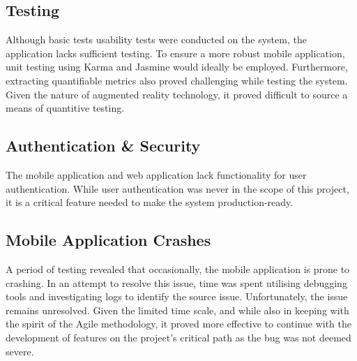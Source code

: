 \subsection{Testing}
Although basic tests usability tests were conducted on the system, the application lacks sufficient testing. To ensure a more robust mobile application, unit testing using Karma and Jasmine would ideally be employed. Furthermore, extracting quantifiable metrics also proved challenging while testing the system. Given the nature of augmented reality technology, it proved difficult to source a means of quantitive testing. 

\subsection{Authentication \& Security}
The mobile application and web application lack functionality for user authentication. While user authentication was never in the scope of this project, it is a critical feature needed to make the system production-ready.

\subsection{Mobile Application Crashes}
 A period of testing revealed that occasionally, the mobile application is prone to crashing. In an attempt to resolve this issue, time was spent utilising debugging tools and investigating logs to identify the source issue. Unfortunately, the issue remains unresolved. Given the limited time scale, and while also in keeping with the spirit of the Agile methodology, it proved more effective to continue with the development of features on the project’s critical path as the bug was not deemed severe.


